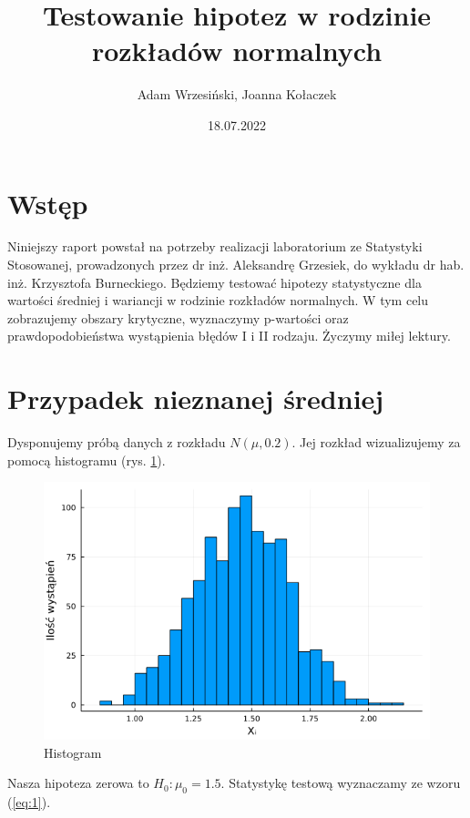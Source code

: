 \documentclass{article}
\title{Testowanie hipotez w rodzinie rozkładów normalnych}
\author{Adam Wrzesiński, Joanna Kołaczek}
\date{18.07.2022}
\theoremstyle{break}
\begin{document}
	\maketitle
	\newpage
	\tableofcontents
	\clearpage


\section*{Wstęp}
	
	Niniejszy raport powstał na potrzeby realizacji laboratorium ze Statystyki Stosowanej, prowadzonych przez dr inż. Aleksandrę Grzesiek, do wykładu dr hab. inż. Krzysztofa Burneckiego. Będziemy testować hipotezy statystyczne dla wartości średniej i wariancji w rodzinie rozkładów normalnych. W tym celu zobrazujemy obszary krytyczne, wyznaczymy p-wartości oraz prawdopodobieństwa wystąpienia błędów I i II rodzaju. Życzymy miłej lektury.


	
\section{Przypadek nieznanej średniej}
Dysponujemy próbą danych z rozkładu $N(\mu,0.2)$. Jej rozkład wizualizujemy za pomocą histogramu (rys. \ref{fig:hist}).
\begin{figure}[H]
	\begin{center}
		\includegraphics[scale=0.5]{hist1.png}
		\caption{Histogram}
		\label{fig:hist}
	\end{center}
\end{figure}
Nasza hipoteza zerowa to $H_0: \mu_0 = 1.5$. Statystykę testową wyznaczamy ze wzoru (\ref{eq:1}).
\end{document}
